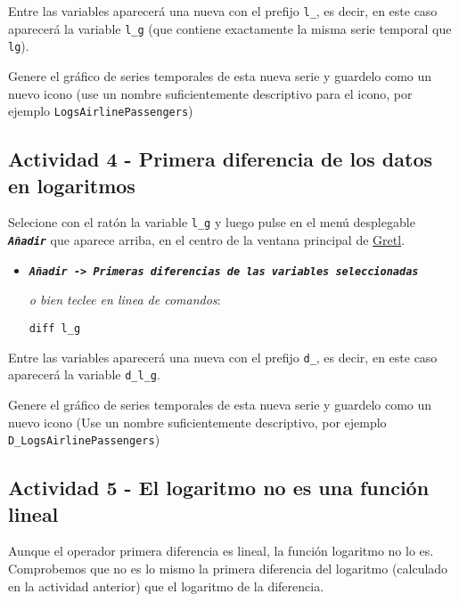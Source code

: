 \documentclass[11pt]{article}
\begin{document}
Entre las variables aparecerá una nueva con el prefijo \texttt{l\_}, es decir,
en este caso aparecerá la variable \texttt{l\_g} (que contiene exactamente la
misma serie temporal que \texttt{lg}).

Genere el gráfico de series temporales de esta nueva serie y guardelo
como un nuevo icono (use un nombre suficientemente descriptivo para el
icono, por ejemplo \texttt{LogsAirlinePassengers})

{\vspace{0pt} \footnotesize \color{gray!70!black}
}

\subsection{Actividad 4 - Primera diferencia de los datos en logaritmos}
\label{sec:orgeefed41}

Selecione con el ratón la variable \texttt{l\_g} y luego pulse en el menú desplegable \textbf{\emph{\texttt{Añadir}}} que aparece arriba, en el centro de la
ventana principal de \href{https://gretl.sourceforge.net/es.html}{Gretl}.
\begin{itemize}
\item \textbf{\emph{\texttt{Añadir -> Primeras diferencias de las variables seleccionadas}}}

{\vspace{0pt} \footnotesize \color{gray!70!black}
\emph{o bien teclee en linea de comandos}: 
\begin{verbatim}
diff l_g
\end{verbatim}
}
\end{itemize}

Entre las variables aparecerá una nueva con el prefijo \texttt{d\_}, es decir,
en este caso aparecerá la variable \texttt{d\_l\_g}.

Genere el gráfico de series temporales de esta nueva serie y guardelo
como un nuevo icono (Use un nombre suficientemente descriptivo, por
ejemplo \texttt{D\_LogsAirlinePassengers})

{\vspace{0pt} \footnotesize \color{gray!70!black}
}

\subsection{Actividad 5 - El logaritmo no es una función lineal}
\label{sec:org52b496d}

Aunque el operador primera diferencia es lineal, la función logaritmo
no lo es. Comprobemos que no es lo mismo la primera diferencia del
logaritmo (calculado en la actividad anterior) que el logaritmo de la
diferencia.
\end{document}
